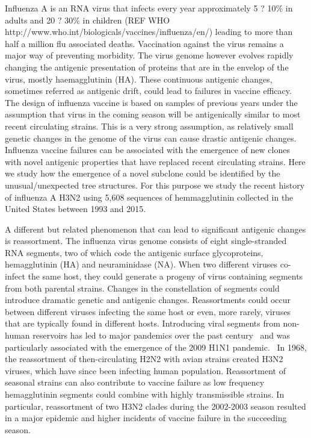 \documentclass[a4paper,11pt]{article}
\begin{document}
Influenza A is an RNA virus that infects every year approximately 5 ? 10\% in adults and 20 ? 30\% in children (REF WHO http://www.who.int/biologicals/vaccines/influenza/en/) leading to more than half a million flu associated deaths. Vaccination against the virus remains a major way of preventing morbidity. The virus genome however evolves rapidly changing the antigenic presentation of proteins that are in the envelop of the virus, mostly haemagglutinin (HA). These continuous antigenic changes, sometimes referred as antigenic drift, could lead to failures in vaccine efficacy.  The design of influenza vaccine is based on samples of previous years under the assumption that virus in the coming season will be antigenically similar to most recent circulating strains. This is a very strong assumption, as relatively small genetic changes in the genome of the virus can cause drastic antigenic changes.  Influenza vaccine failures can be associated with the emergence of new clones with novel antigenic properties that have replaced recent circulating strains. Here we study how the emergence of a novel subclone could be identified by the unusual/unexpected tree structures. For this purpose we study the recent history of influenza A H3N2 using 5,608 sequences of hemmagglutinin collected in the United States between 1993 and 2015.

A different but related phenomenon that can lead to significant antigenic changes is reassortment. The influenza virus genome consists of eight single-stranded RNA segments, two of which code the antigenic surface glycoproteins, hemagglutinin (HA) and neuraminidase (NA). When two different viruses co-infect the same host, they could generate a progeny of virus containing segments from both parental strains. Changes in the constellation of segments could introduce dramatic genetic and antigenic changes. Reassortments could occur between different viruses infecting the same host or even, more rarely, viruses that are typically found in different hosts. Introducing viral segments from non-human reservoirs has led to major pandemics over the past century~\cite{rabadan2007evolution, rabadan2008non} and  was particularly associated with the emergence of the 2009 H1N1 pandemic.~\cite{trifonov2009geographic, solovyov2009cluster}
In 1968, the reassortment of then-circulating H2N2 with avian strains created H3N2 viruses, which have since been infecting human population.
Reassortment of seasonal strains can also contribute to vaccine failure as low frequency hemagglutinin segments could combine with highly transmissible strains. In particular, reassortment of two H3N2 clades during the 2002-2003 season resulted in a major epidemic and higher incidents of vaccine failure in the succeeding season.~\cite{centers2004preliminary}
\end{document}
